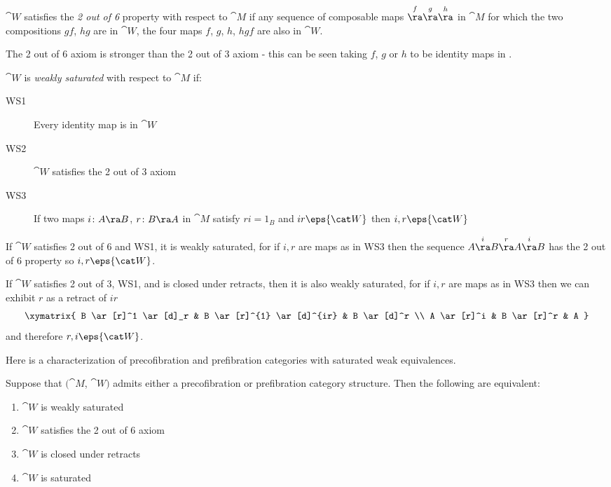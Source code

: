 \begin{defn}
\label{defn:2outof6}
${\cat W}$ satisfies the {\it 2 out of 6} property with respect to ${\cat M}$ if any sequence of composable maps $\overset{f}{\ra} \overset{g}{\ra} \overset{h}{\ra}$ in ${\cat M}$ for which the two compositions $gf$, $hg$ are in ${\cat W}$, the four maps $f$, $g$, $h$, $hgf$ are also in ${\cat W}$.
\end{defn}

The 2 out of 6 axiom is stronger than the 2 out of 3 axiom - this can be seen taking $f$, $g$ or $h$ to be identity maps in .

\begin{defn}
\label{defn:weaksaturation}
${\cat W}$ is {\it weakly saturated} with respect to ${\cat M}$ if:
\begin{description}
\item[WS1]
Every identity map is in ${\cat W}$
\item[WS2]
${\cat W}$ satisfies the 2 out of 3 axiom
\item[WS3]
If two maps $i \colon A \ra B$, $r \colon B \ra A$ in ${\cat M}$ satisfy $ri = 1_B$ and $ir \eps {\cat W}$ then $i, r \eps {\cat W}$
\end{description}
\end{defn}

If ${\cat W}$ satisfies 2 out of 6 and WS1, it is weakly saturated, for if $i, r$ are maps as in WS3 then the sequence $A \overset{i}{\ra} B \overset{r}{\ra} A \overset{i}{\ra} B$ has the 2 out of 6 property so $i, r \eps {\cat W}$.

If ${\cat W}$ satisfies 2 out of 3, WS1, and is closed under retracts, then it is also weakly saturated, for if $i, r$ are maps as in WS3 then we can exhibit $r$ as a retract of $ir$
\[
\xymatrix{
  B \ar[r]^1 \ar[d]_r & B \ar[r]^{1} \ar[d]^{ir} & B \ar[d]^r \\
  A \ar[r]^i & B \ar[r]^r & A
}
\]
and therefore $r, i \eps {\cat W}$.

Here is a characterization of precofibration and prefibration categories with saturated weak equivalences. 

\begin{thm}
\label{thm:cofcatissat2}
Suppose that $({\cat M}$, ${\cat W})$ admits either a precofibration or prefibration category structure. Then the following are equivalent:
\begin{enumerate}
\item
${\cat W}$ is weakly saturated
\item
${\cat W}$ satisfies the 2 out of 6 axiom
\item
${\cat W}$ is closed under retracts
\item
${\cat W}$ is saturated
\end{enumerate}
\end{thm}

